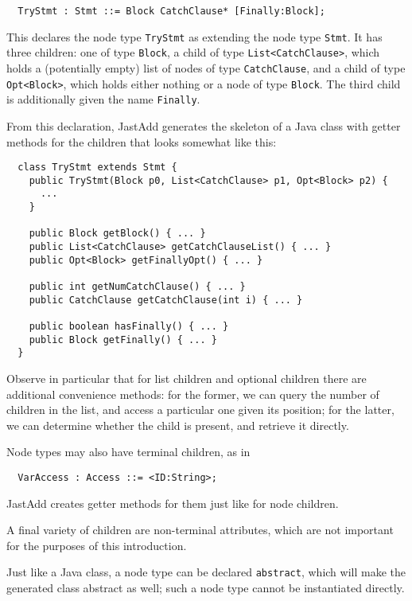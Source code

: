 \documentclass{article}
\newcommand{\nt}[1]{\texttt{#1}}
\newcommand{\child}[1]{\texttt{#1}}
\newcommand{\code}[1]{\lstinline$#1$}
\begin{document}
\begin{lstlisting}
  TryStmt : Stmt ::= Block CatchClause* [Finally:Block];
\end{lstlisting}

This declares the node type \nt{TryStmt} as extending the node type \nt{Stmt}. It has three children: one of type \nt{Block}, a child of type \code{List<CatchClause>}, which holds a (potentially empty) list of nodes of type \nt{CatchClause}, and a child of type \code{Opt<Block>}, which holds either nothing or a node of type \nt{Block}. The third child is additionally given the name \child{Finally}.

From this declaration, JastAdd generates the skeleton of a Java class with getter methods for the children that looks somewhat like this:

\begin{lstlisting}
  class TryStmt extends Stmt {
    public TryStmt(Block p0, List<CatchClause> p1, Opt<Block> p2) {
      ...
    }

    public Block getBlock() { ... }
    public List<CatchClause> getCatchClauseList() { ... }
    public Opt<Block> getFinallyOpt() { ... }

    public int getNumCatchClause() { ... }
    public CatchClause getCatchClause(int i) { ... }

    public boolean hasFinally() { ... }
    public Block getFinally() { ... }
  }
\end{lstlisting}

Observe in particular that for list children and optional children there are additional convenience methods: for the former, we can query the number of children in the list, and access a particular one given its position; for the latter, we can determine whether the child is present, and retrieve it directly.

Node types may also have terminal children, as in

\begin{lstlisting}
  VarAccess : Access ::= <ID:String>;
\end{lstlisting}

JastAdd creates getter methods for them just like for node children.

A final variety of children are non-terminal attributes, which are not important for the purposes of this introduction.

Just like a Java class, a node type can be declared \code{abstract}, which will make the generated class abstract as well; such a node type cannot be instantiated directly.
\end{document}
